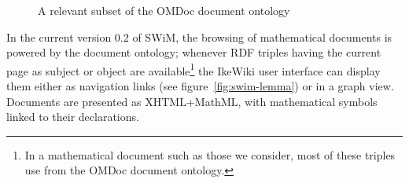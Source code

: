 \begin{background}
\begin{figure}
  \caption{A relevant subset of the OMDoc document ontology}
  \label{fig:doconto}
\end{figure}

In the current version 0.2 of SWiM, the browsing of mathematical documents is
powered by the document ontology; whenever RDF triples having the current page
as subject or object are available\footnote{In a mathematical document such as
  those we consider, most of these triples use from the OMDoc document
  ontology.} the IkeWiki user interface can display them either as
navigation links (see figure~\ref{fig:swim-lemma}) or in a graph view.
Documents are presented as XHTML+MathML, with mathematical symbols linked to
their declarations.
\end{background}

